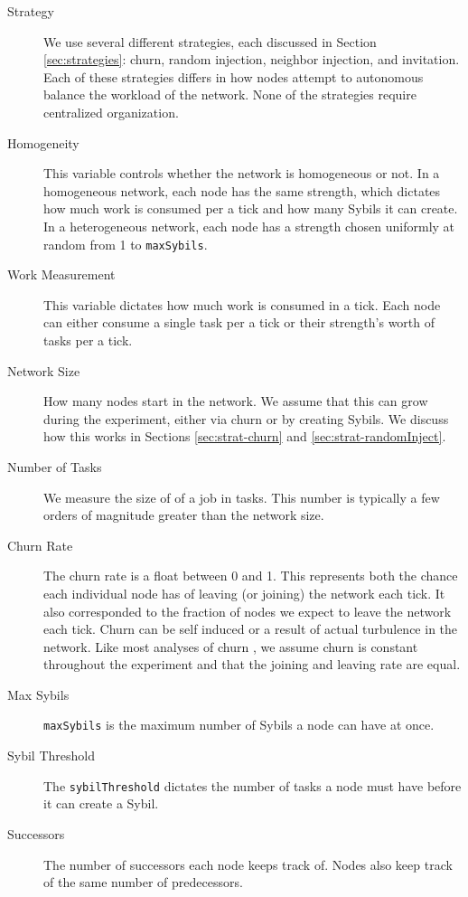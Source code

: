 \begin{description}
	\item [Strategy] We use several different strategies, each discussed in Section \ref{sec:strategies}: churn, random injection, neighbor injection, and invitation.
	Each of these strategies differs in how nodes attempt  to autonomous balance the workload of the network.
	None of the strategies require centralized organization.
	\item [Homogeneity]  This variable controls whether the network is homogeneous or not.
	In a homogeneous network, each node has the same strength, which dictates how much work is consumed per a tick and how many Sybils it can create.
	In a heterogeneous network, each node has a strength chosen uniformly at random from 1 to \texttt{maxSybils}.
	\item [Work Measurement] This variable dictates how much work is consumed in a tick.
	Each node can either consume a single task per a tick or their strength's worth of tasks per a tick.
	\item [Network Size]  How many nodes start in the network.  
	We assume that this can grow during the experiment, either via churn or by creating Sybils.
	We discuss how this works in Sections \ref{sec:strat-churn} and \ref{sec:strat-randomInject}.
	\item [Number of Tasks] We measure the size of of a job in tasks.
	This number is typically a few orders of magnitude greater than the network size.
	\item [Churn Rate] The churn rate is a float between 0 and 1.
	This represents both the chance each individual node has of leaving (or joining) the network each tick.
	It also corresponded to the fraction of nodes we expect to leave the network each tick.
	Churn can be self induced or a result of actual turbulence in the network.
	Like most analyses of churn \cite{marozzo2012p2p}, we assume churn is constant throughout the experiment and that the joining and leaving rate are equal.
	\item [Max Sybils] \texttt{maxSybils} is the maximum number of Sybils a node can have at once.
	\item [Sybil Threshold] The \texttt{sybilThreshold} dictates the number of tasks a node must have before it can create a Sybil.
	\item [Successors] The number of successors each node keeps track of.  
	Nodes also keep track of the same number of predecessors.
	
\end{description}

